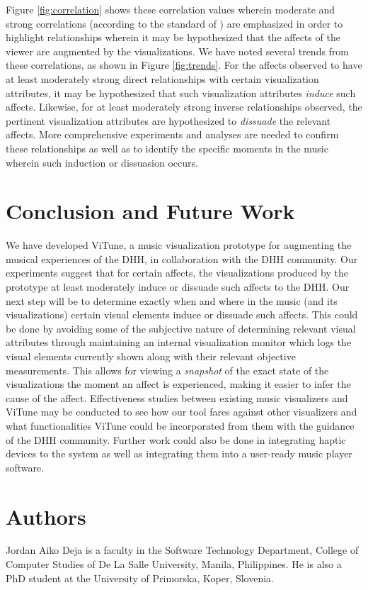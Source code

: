 \documentclass{sigchi-ext}
\begin{document}
Figure \ref{fig:correlation} shows these correlation values wherein moderate and strong correlations (according to the standard of \cite{Cohen:1988}) are emphasized in order to highlight relationships wherein it may be hypothesized that the affects of the viewer are augmented by the visualizations. We have noted several trends from these correlations, as shown in Figure \ref{fig:trends}. For the affects observed to have at least moderately strong direct relationships with certain visualization attributes, it may be hypothesized that such visualization attributes \textit{induce} such affects. Likewise, for at least moderately strong inverse relationships observed, the pertinent visualization attributes are hypothesized to \textit{dissuade} the relevant affects. More comprehensive experiments and analyses are needed to confirm these relationships as well as to identify the specific moments in the music wherein such induction or dissuasion occurs.



\section{Conclusion and Future Work}
We have developed ViTune, a music visualization prototype for augmenting the musical experiences of the DHH, in collaboration with the DHH community. Our experiments suggest that for certain affects, the visualizations produced by the prototype at least moderately induce or dissuade such affects to the DHH. Our next step will be to determine exactly when and where in the music (and its visualizations) certain visual elements induce or dissuade such affects. This could be done by avoiding some of the subjective nature of determining relevant visual attributes through maintaining an internal visualization monitor which logs the visual elements currently shown along with their relevant objective measurements. This allows for viewing a \textit{snapshot} of the exact state of the visualizations the moment an affect is experienced, making it easier to infer the cause of the affect. Effectiveness studies between existing music visualizers and ViTune may be conducted to see how our tool fares against other visualizers and what functionalities ViTune could be incorporated from them with the guidance of the DHH community. Further work could also be done in integrating haptic devices to the system as well as integrating them into a user-ready music player software.



\section{Authors}
Jordan Aiko Deja is a faculty in the Software Technology Department, College of Computer Studies of De La Salle University, Manila, Philippines. He is also a PhD student at the University of Primorska, Koper, Slovenia. 
\end{document}
